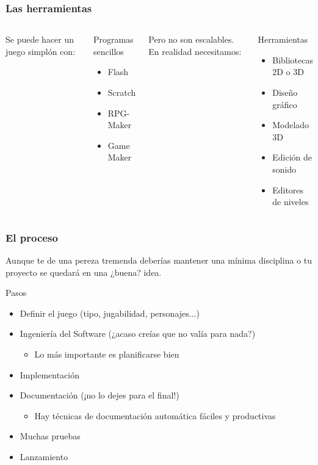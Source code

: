 \begin{frame}
	\frametitle{Las herramientas}
	
		
	\begin{columns}[c]
	\column{150pt}	
	
	Se puede hacer un juego simplón con:
	
	\begin{block}{Programas sencillos}
		\begin{itemize}
		    \item Flash
		    \item Scratch
		    \item RPG-Maker
		    \item Game Maker
		\end{itemize}            
	\end{block}
	
	\column{150pt}
	
	Pero no son escalables. En realidad necesitamos:
	
	    \begin{block}{Herramientas}
		\begin{itemize}
		    \item Bibliotecas 2D o 3D
		    \item Diseño gráfico
		    \item Modelado 3D
		    \item Edición de sonido
		    \item Editores de niveles
		\end{itemize}            
	\end{block}
	\end{columns}
\end{frame}

\begin{frame}
	\frametitle{El proceso}
	
	Aunque te de una pereza tremenda deberías mantener una mínima
	disciplina o tu proyecto se quedará en una ¿buena? idea.
		
	\begin{block}{Pasos}
		\begin{itemize}
			\item Definir el juego (tipo, jugabilidad, personajes...)
			\item Ingeniería del Software (¿acaso creías que no valía para nada?)
			\begin{itemize}
			    \item Lo más importante es planificarse bien
			\end{itemize}
			\item Implementación
			\item Documentación (¡no lo dejes para el final!)
			\begin{itemize}
			    \item Hay técnicas de documentación automática fáciles y productivas
			\end{itemize}
			\item Muchas pruebas
			\item Lanzamiento
		\end{itemize}            
	\end{block}        
	
\end{frame}

